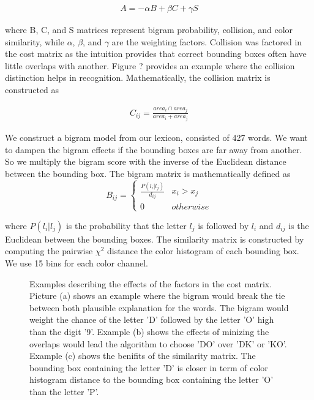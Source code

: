 \documentclass[10pt,twocolumn,letterpaper]{article}
\begin{document}
\begin{eqnarray*}
A=-\alpha B+\beta C+\gamma S
\end{eqnarray*}

where B, C, and S matrices represent bigram probability, collision, and color similarity, while $\alpha$, $\beta$, and $\gamma$ are the weighting factors.
Collision was factored in the cost matrix as the intuition provides that correct bounding boxes often have little overlaps with another. Figure ? provides an example where the collision distinction helps in recognition. Mathematically, the collision matrix is constructed as 

\begin{eqnarray*}
C_{ij}=\frac{area_{i}\cap area_{j}}{area_{i}+area_{j}}
\end{eqnarray*}

We construct a bigram model from our lexicon, consisted of 427 words. We want to dampen the bigram effects if the bounding boxes are far away from another. So we multiply the bigram score with the inverse of the Euclidean distance between the bounding box. The bigram matrix is mathematically defined as
\[
B_{ij}=\begin{cases}
\frac{P(l_{i}|l_{j})}{d_{ij}} & x_{i}>x_{j}\\
0 & otherwise
\end{cases}
\]

where $P(l_{i}|l_{j})$ is the probability that the letter $l_{j}$ is followed by $l_{i}$ and $d_{ij}$ is the Euclidean between the bounding boxes. The similarity matrix is constructed by computing the pairwise $\chi^2$ distance the color histogram of each bounding box. We use 15 bins for each color channel.

\begin{figure}[]
\caption{Examples describing the effects of the factors in the cost matrix. Picture (a) shows an example where the bigram would break the tie between both plausible explanation for the words. The bigram would weight the chance of the letter 'D' followed by the letter 'O' high than the digit '9'. Example (b) shows the effects of minizing the overlaps would lead the algorithm to choose 'DO' over 'DK' or 'KO'. Example (c) shows the benifits of the similarity matrix. The bounding box containing the letter 'D' is closer in term of color histogram distance to the bounding box containing the letter 'O' than the letter 'P'. }\label{fig:bookstein}
\end{figure}
\end{document}
